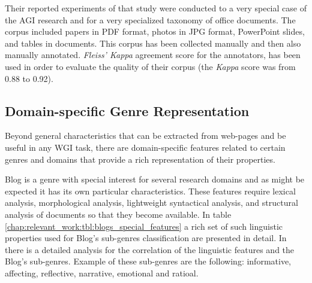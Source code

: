 Their reported experiments of that study were conducted to a very special case of  the AGI research and for a very specialized taxonomy of office documents. The corpus included papers in PDF format, photos in JPG format, PowerPoint slides, and tables in documents. This corpus has been collected manually and then also manually annotated. \textit{Fleiss' Kappa} agreement score for the annotators, has been used in order to evaluate the quality of their corpus (the \textit{Kappa} score was from 0.88 to 0.92).

\subsection{Domain-specific Genre Representation}

Beyond general characteristics that can be extracted from web-pages and be useful in any WGI task, there are domain-specific features related to certain genres and domains that provide a rich representation of their properties.

Blog is a genre with special interest for several research domains and as might be expected it has its own particular characteristics. These features require lexical analysis, morphological analysis, lightweight syntactical analysis, and structural analysis of documents so that they become available. In table \ref{chap:relevant_work:tbl:blogs_special_features} a rich set of such linguistic properties used for Blog's sub-genres classification are presented in detail. In \parencite{virik2017blog} there is a detailed analysis for the correlation of the linguistic features and the Blog's sub-genres. Example of these sub-genres are the following: informative, affecting, reflective, narrative, emotional and ratioal.

